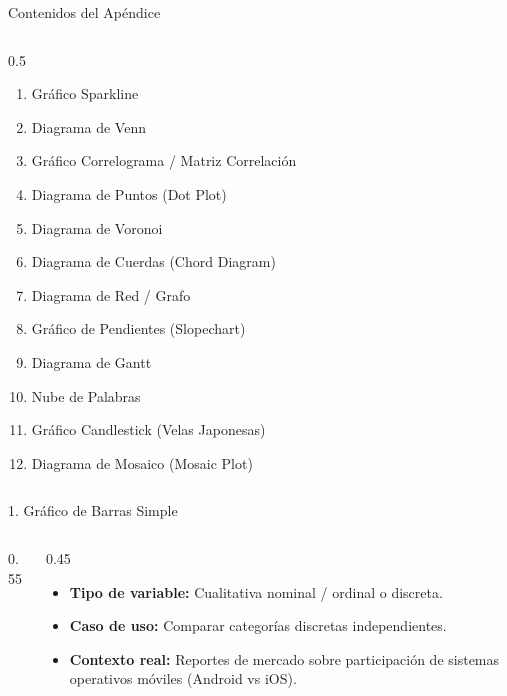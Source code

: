 \documentclass[aspectratio=169,10pt]{beamer}
\begin{document}
\begin{frame}{Contenidos del Apéndice}
\begin{columns}[t]
\begin{column}{0.5\textwidth}
\begin{enumerate}
\item Gráfico Sparkline
\item Diagrama de Venn
\item Gráfico Correlograma / Matriz Correlación
\item Diagrama de Puntos (Dot Plot)
\item Diagrama de Voronoi
\item Diagrama de Cuerdas (Chord Diagram)
\item Diagrama de Red / Grafo
\item Gráfico de Pendientes (Slopechart)
\item Diagrama de Gantt
\item Nube de Palabras
\item Gráfico Candlestick (Velas Japonesas)
\item Diagrama de Mosaico (Mosaic Plot)
\end{enumerate}
\end{column}
\end{columns}
\end{frame}


\begin{frame}{1. Gráfico de Barras Simple}
\begin{columns}
\begin{column}{0.55\textwidth}
\end{column}
\begin{column}{0.45\textwidth}
\begin{itemize}\small
\item \textbf{Tipo de variable:} Cualitativa nominal / ordinal o discreta.
\item \textbf{Caso de uso:} Comparar categorías discretas independientes.
\item \textbf{Contexto real:} Reportes de mercado sobre participación de sistemas operativos móviles (Android vs iOS).
\end{itemize}
\end{column}
\end{columns}
\end{frame}
\end{document}

